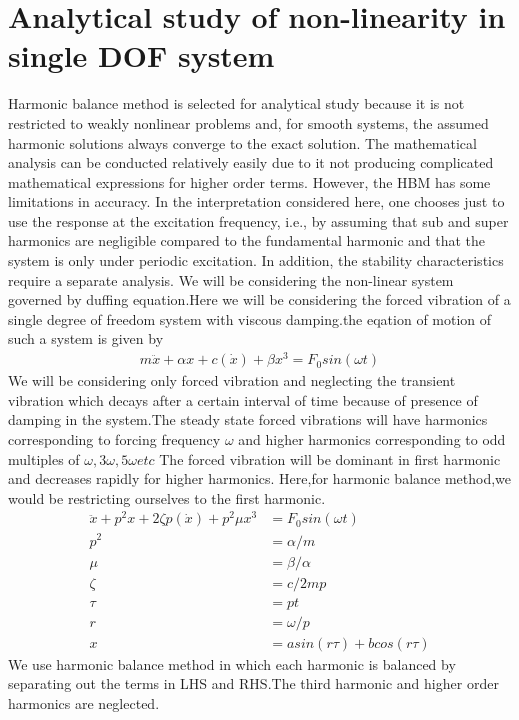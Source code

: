 \chapter{Analytical study of non-linearity in single DOF system }
Harmonic balance method is selected for analytical study because it is not restricted to weakly nonlinear problems and, for smooth systems, the assumed harmonic solutions always converge to the exact solution. The mathematical analysis can be conducted relatively easily due to it not producing complicated mathematical expressions for higher order terms. However, the HBM has some limitations in accuracy. In the interpretation considered here, one chooses just to use the response at the excitation frequency, i.e., by assuming that sub and super harmonics are negligible compared to the fundamental harmonic and that the system is only under periodic excitation. In addition, the stability characteristics require a separate analysis. 
We will be considering the non-linear system governed by duffing equation.Here we will be considering the forced vibration of a single degree of freedom system with viscous damping.the eqation of motion of such a system is given by
\begin{align}
m\ddot{x}+\alpha x+c(\dot{x})+\beta x^3=F_0sin(\omega t)
\end{align}
We will be considering only forced vibration and neglecting the transient vibration which decays after a certain interval of time because of presence of damping in the system.The steady state forced vibrations will have harmonics corresponding to forcing frequency $\omega$ and higher harmonics corresponding to odd multiples of $\omega ,3\omega , 5\omega etc$ The forced vibration will be dominant in first harmonic and decreases rapidly for higher harmonics.
Here,for harmonic balance method,we would be restricting ourselves to the first harmonic.
\begin{align}
\ddot{x}+p^2 x+2 \zeta p (\dot{x})+p^2 \mu x^3 &=F_0sin(\omega t)\\
p^2 &= \alpha /m \\
\mu & = \beta / \alpha \\
\zeta &=c/2mp \\
\tau &= pt \\
r &= \omega /p \\
x &= asin(r\tau )+bcos(r\tau)
\end{align}
We use harmonic balance method in which each harmonic is balanced by separating out the terms in LHS and RHS.The third harmonic and higher order harmonics are neglected.
